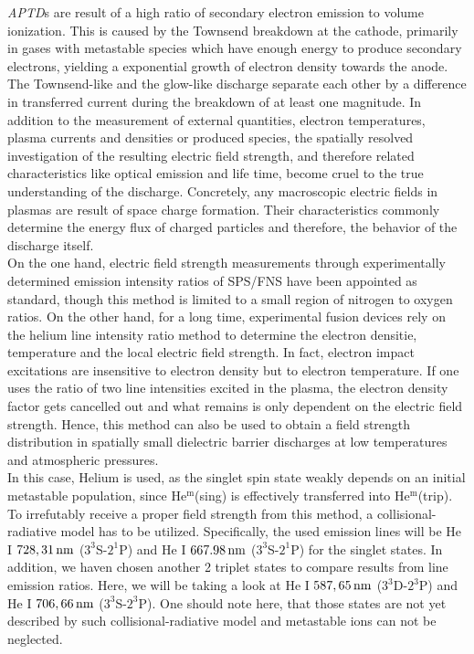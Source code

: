 \documentclass[a4paper,10pt,twoside]{article}
\newcommand{\tilt}[1]{\textit{#1}}
\begin{document}
		\tilt{APTD}s are result of a high ratio of secondary electron emission to volume ionization. This is caused by the Townsend breakdown at the cathode, primarily in gases with metastable species which have enough energy to produce secondary electrons, yielding a exponential growth of electron density towards the anode.\\
		The Townsend-like and the glow-like discharge separate each other by a difference in transferred current during the breakdown of at least one magnitude. In addition to the measurement of external quantities, electron temperatures, plasma currents and densities or produced species, the spatially resolved investigation of the resulting electric field strength, and therefore related characteristics like optical emission and life time, become cruel to the true understanding of the discharge. Concretely, any macroscopic electric fields in plasmas are result of space charge formation. Their characteristics commonly determine the energy flux of charged particles and therefore, the behavior of the discharge itself. \\
		On the one hand, electric field strength measurements through experimentally determined emission intensity ratios of SPS/FNS have been appointed as standard, though this method is limited to a small region of nitrogen to oxygen ratios. On the other hand, for a long time, experimental fusion devices rely on the helium line intensity ratio method to determine the electron densitie, temperature and the local electric field strength. In fact, electron impact excitations are insensitive to electron density but to electron temperature. If one uses the ratio of two line intensities excited in the plasma, the electron density factor gets cancelled out and what remains is only dependent on the electric field strength. Hence, this method can also be used to obtain a field strength distribution in spatially small dielectric barrier discharges at low temperatures and atmospheric pressures.\\
		In this case, Helium is used, as the singlet spin state weakly depends on an initial metastable population, since He$^{\text{m}}$(sing) is effectively transferred into He$^{\text{m}}$(trip). To irrefutably receive a proper field strength from this method, a collisional-radiative model has to be utilized. Specifically, the used emission lines will be He I $\unit[728,31]{nm}$ ($3^3$S-$2^1$P) and He I $\unit[667.98]{nm}$ ($3^3$S-$2^1$P) for the singlet states. In addition, we haven chosen another 2 triplet states to compare results from line emission ratios. Here, we will be taking a look at He I $\unit[587,65]{nm}$ ($3^3$D-$2^3$P) and He I $\unit[706,66]{nm}$ ($3^3$S-$2^3$P). One should note here, that those states are not yet described by such collisional-radiative model and metastable ions can not be neglected.\\
\end{document}
